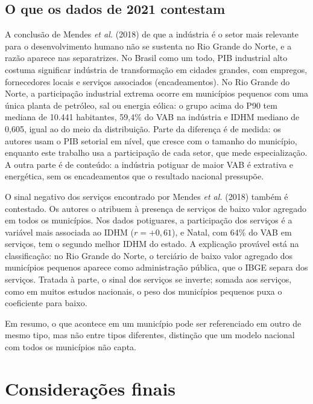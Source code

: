 \documentclass[12pt,a4paper]{article}
\begin{document}
\subsection{O que os dados de 2021 contestam}

A conclusão de Mendes \textit{et al.} (2018) de que a indústria é o setor mais relevante para o desenvolvimento humano não se sustenta no Rio Grande do Norte, e a razão aparece nas separatrizes. No Brasil como um todo, PIB industrial alto costuma significar indústria de transformação em cidades grandes, com empregos, fornecedores locais e serviços associados (encadeamentos). No Rio Grande do Norte, a participação industrial extrema ocorre em municípios pequenos com uma única planta de petróleo, sal ou energia eólica: o grupo acima do P90 tem mediana de 10.441 habitantes, 59,4\% do VAB na indústria e IDHM mediano de 0,605, igual ao do meio da distribuição. Parte da diferença é de medida: os autores usam o PIB setorial em nível, que cresce com o tamanho do município, enquanto este trabalho usa a participação de cada setor, que mede especialização. A outra parte é de conteúdo: a indústria potiguar de maior VAB é extrativa e energética, sem os encadeamentos que o resultado nacional pressupõe.

O sinal negativo dos serviços encontrado por Mendes \textit{et al.} (2018) também é contestado. Os autores o atribuem à presença de serviços de baixo valor agregado em todos os municípios. Nos dados potiguares, a participação dos serviços é a variável mais associada ao IDHM ($r = +0{,}61$), e Natal, com 64\% do VAB em serviços, tem o segundo melhor IDHM do estado. A explicação provável está na classificação: no Rio Grande do Norte, o terciário de baixo valor agregado dos municípios pequenos aparece como administração pública, que o IBGE separa dos serviços. Tratada à parte, o sinal dos serviços se inverte; somada aos serviços, como em muitos estudos nacionais, o peso dos municípios pequenos puxa o coeficiente para baixo.

Em resumo, o que acontece em um município pode ser referenciado em outro de mesmo tipo, mas não entre tipos diferentes, distinção que um modelo nacional com todos os municípios não capta.

\section{Considerações finais}
\end{document}
